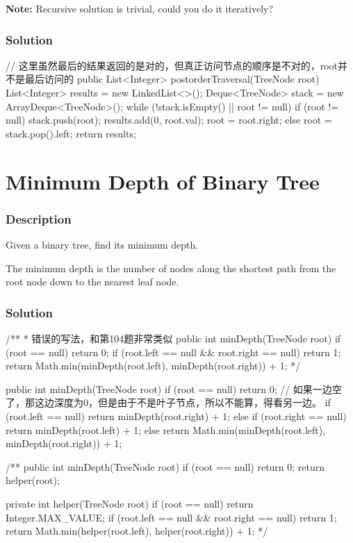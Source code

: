 \textbf{Note:} Recursive solution is trivial, could you do it iteratively?

\subsubsection{Solution}

\begin{Code}
// 这里虽然最后的结果返回的是对的，但真正访问节点的顺序是不对的，root并不是最后访问的
public List<Integer> postorderTraversal(TreeNode root) {
    List<Integer> results = new LinkedList<>();
    Deque<TreeNode> stack = new ArrayDeque<TreeNode>();
    while (!stack.isEmpty() || root != null) {
        if (root != null) {
            stack.push(root);
            results.add(0, root.val);
            root = root.right;
        } else {
            root = stack.pop().left;
        }
    }
    return results;
}
\end{Code}

\newpage

\section{Minimum Depth of Binary Tree} %

\subsubsection{Description}
Given a binary tree, find its minimum depth.

The minimum depth is the number of nodes along the shortest path from the root node down to the nearest leaf node.

\subsubsection{Solution}

\begin{Code}
/**
 * 错误的写法，和第104题非常类似
public int minDepth(TreeNode root) {
    if (root == null) {
        return 0;
    }
    if (root.left == null && root.right == null) {
        return 1;
    }
    return Math.min(minDepth(root.left), minDepth(root.right)) + 1;
}*/

public int minDepth(TreeNode root) {
    if (root == null) {
        return 0;
    }
    // 如果一边空了，那这边深度为0，但是由于不是叶子节点，所以不能算，得看另一边。
    if (root.left == null) {
        return minDepth(root.right) + 1;
    } else if (root.right == null) {
        return minDepth(root.left) + 1;
    } else {
        return Math.min(minDepth(root.left), minDepth(root.right)) + 1;
    }
}

/**
public int minDepth(TreeNode root) {
    if (root == null) {
        return 0;
    }
    return helper(root);
}

private int helper(TreeNode root) {
    if (root == null) {
        return Integer.MAX_VALUE;
    }
    if (root.left == null && root.right == null) {
        return 1;
    }
    return Math.min(helper(root.left), helper(root.right)) + 1;
}*/
\end{Code}

